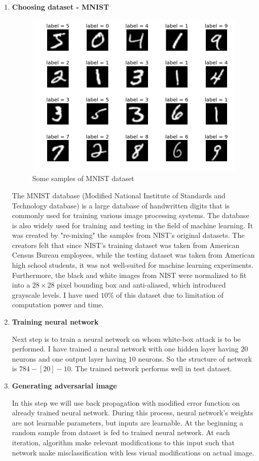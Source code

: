         \begin{enumerate}
            \item \textbf{Choosing dataset - MNIST}

                \begin{figure}[b]
                    \centering
                    \includegraphics[width=0.5\linewidth]{images/mnist.png}
                    \caption{Some samples of MNIST dataset}
                    \label{fig:mnist}
                \end{figure}
                    
                The MNIST database (Modified National Institute of Standards and Technology database) is a large database of handwritten digits that is commonly used for training various image processing systems. The database is also widely used for training and testing in the field of machine learning. It was created by "re-mixing" the samples from NIST's original datasets. The creators felt that since NIST's training dataset was taken from American Census Bureau employees, while the testing dataset was taken from American high school students, it was not well-suited for machine learning experiments. Furthermore, the black and white images from NIST were normalized to fit into a $28 \times 28$ pixel bounding box and anti-aliased, which introduced grayscale levels. I have used $10\%$ of this dataset due to limitation of computation power and time.

            \item \textbf{Training neural network}

                Next step is to train a neural network on whom white-box attack is to be performed. I have trained a neural network with one hidden layer having $20$ neurons and one output layer having $10$ neurons. So the structure of network is $784 - [20] - 10$. The trained network performs well in test dataset. 	

            \item \textbf{Generating adversarial image}

                In this step we will use back propagation with modified error function on already trained neural network. During this process, neural network's weights are not learnable parameters, but inputs are learnable. At the beginning a random sample from dataset is fed to trained neural network. At each iteration, algorithm make relevant modifications to this input such that network make misclassification with less visual modifications on actual image.

        \end{enumerate}

